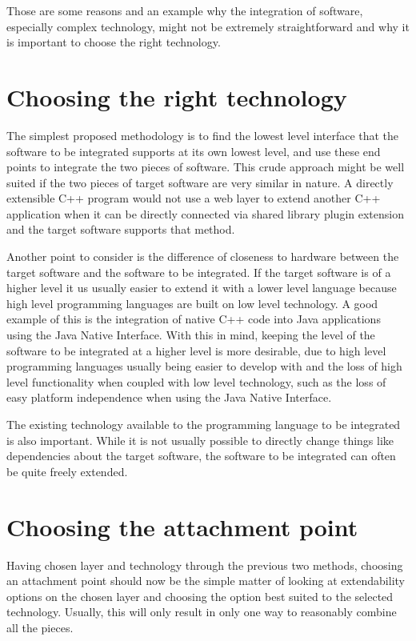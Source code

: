 \documentclass[BSA,Bachelor,english]{twbook}%
\begin{document}
Those are some reasons and an example why the integration of software, especially complex technology, might not be extremely straightforward and why it is important to choose the right technology.

\section{Choosing the right technology}

The simplest proposed methodology is to find the lowest level interface that the software to be integrated supports at its own lowest level, and use these end points to integrate the two pieces of software. This crude approach might be well suited if the two pieces of target software are very similar in nature. A directly extensible C++ program would not use a web layer to extend another C++ application when it can be directly connected via shared library plugin extension and the target software supports that method.

Another point to consider is the difference of closeness to hardware between the target software and the software to be integrated. If the target software is of a higher level it us usually easier to extend it with a lower level language because high level programming languages are built on low level technology. A good example of this is the integration of native C++ code into Java applications using the Java Native Interface. With this in mind, keeping the level of the software to be integrated at a higher level is more desirable, due to high level programming languages usually being easier to develop with and the loss of high level functionality when coupled with low level technology, such as the loss of easy platform independence when using the Java Native Interface.

The existing technology available to the programming language to be integrated is also important. While it is not usually possible to directly change things like dependencies about the target software, the software to be integrated can often be quite freely extended.

\section{Choosing the attachment point}

Having chosen layer and technology through the previous two methods, choosing an attachment point should now be the simple matter of looking at extendability options on the chosen layer and choosing the option best suited to the selected technology. Usually, this will only result in only one way to reasonably combine all the pieces.
\end{document}
